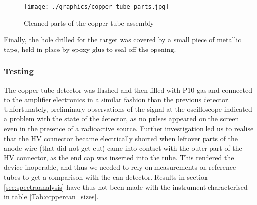 \begin{figure}[htb]
  \centering
  \texttt{[image: ./graphics/copper\_tube\_parts.jpg]}
  \caption{Cleaned parts of the copper tube assembly}
  \label{fig:copper_parts}
\end{figure}

Finally, the hole drilled for the target was covered by a small piece of metallic tape, held in place by epoxy glue to seal off the opening.

\subsubsection{Testing}

The copper tube detector was flushed and then filled with P10 gas and connected to the amplifier electronics in a similar fashion than the previous detector. Unfortunately, preliminary observations of the signal at the oscilloscope indicated a problem with the state of the detector, as no pulses appeared on the screen even in the presence of a radioactive source. Further investigation led us to realise that the HV connector became electrically shorted when leftover parts of the anode wire (that did not get cut) came into contact with the outer part of the HV connector, as the end cap was inserted into the tube. This rendered the device inoperable, and thus we needed to rely on measurements on reference tubes to get a comparison with the can detector. Results in section \ref{sec:spectraanalysis} have thus not been made with the instrument characterised in table \ref{Tab:coppercan_sizes}.

